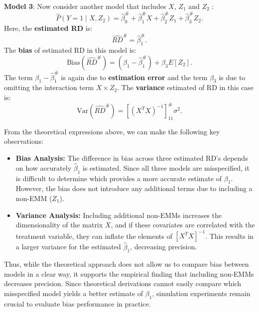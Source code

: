 \documentclass[12pt,oneside]{amsart}
\theoremstyle{definition}
\theoremstyle{remark}
\numberwithin{equation}{section}
\begin{document}
\textbf{Model 3}: Now consider another  model that includes \( X \), \( Z_1 \) and \( Z_2 \) :
\begin{equation}
    \hat{P}(Y = 1 \mid X, Z_2) = \hat{\beta}_0^\# + \hat{\beta}_1^\# X + \hat{\beta}_2^\# Z_1 + \hat{\beta}_3^\# Z_2.
\end{equation}
Here, the \textbf{estimated RD} is:
\begin{equation}
    \hat{RD}^\# = \hat{\beta}_1^\#.
\end{equation}
The \textbf{bias} of estimated RD in this model is:
\begin{equation}
    \text{Bias}(\hat{RD}^\#) = (\beta_1 - \hat{\beta}_1^\#) + \beta_3 E[Z_2].
\end{equation}
The term \( \beta_1 - \hat{\beta}_1^\#\) is again due to \textbf{estimation error} and the term \( \beta_3 \) is due to omitting the interaction term \( X \times Z_2 \). The \textbf{variance} estimated of RD in this case is:
\begin{equation}
    \text{Var}(\hat{RD}^\#) = \left[(X^T X)^{-1}\right]_{11}^\# \sigma^2.
\end{equation}

From the theoretical expressions above, we can make the following key observations:
\begin{itemize}
    \item \textbf{Bias Analysis:} The difference in bias across three estimated RD's depends on how accurately \( \hat{\beta}_1 \) is estimated. Since all three models are misspecified, it is difficult to determine which provides a more accurate estimate of \( \beta_1 \). However, the bias does not introduce any additional terms due to including a non-EMM (\( Z_1 \)).
    \item \textbf{Variance Analysis:} Including additional non-EMMs increases the dimensionality of the matrix $X$, and if these covariates are correlated with the treatment variable, they can inflate the elements of $[X^TX]^{-1}$. This results in a larger variance for the estimated \( \hat{\beta}_1 \), decreasing precision. 
\end{itemize}

Thus, while the theoretical approach does not allow us to compare bias between models in a clear way, it supports the empirical finding that including non-EMMs decreases precision.  Since theoretical derivations cannot easily compare which misspecified model yields a better estimate of \( \beta_1 \), simulation experiments remain crucial to evaluate bias performance in practice.
\end{document}
